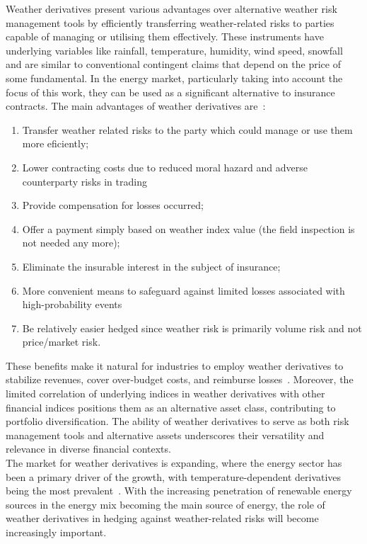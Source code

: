     Weather derivatives present various advantages over alternative weather risk management tools
    by efficiently transferring weather-related risks to parties capable of managing or utilising them effectively.
    These instruments have underlying variables like rainfall, temperature, humidity, wind speed,
    snowfall and are similar to conventional contingent claims that depend on the price of some fundamental.
    In the energy market, particularly taking into account the focus of this work,
    they can be used as a significant alternative to insurance contracts.
    The main advantages of weather derivatives are~\cite{cui_applications_2015}:
    \begin{enumerate}
        \item Transfer weather related risks to the party which could manage or use them more eficiently;
        \item Lower contracting costs due to reduced moral hazard and adverse counterparty risks in trading
        \item Provide compensation for losses occurred;
        \item Offer a payment simply based on weather index value (the field inspection is not needed any more);
        \item Eliminate the insurable interest in the subject of insurance;
        \item More convenient means to safeguard against limited losses associated with high-probability events
        \item Be relatively easier hedged since weather risk is primarily volume risk and not price/market risk.
    \end{enumerate}

    These benefits make it natural for industries to employ weather derivatives to stabilize revenues,
    cover over-budget costs, and reimburse losses~\cite{matsumoto_simultaneous_2021}.
    Moreover, the limited correlation of underlying indices in weather derivatives with other financial indices
    positions them as an alternative asset class, contributing to portfolio diversification.
    The ability of weather derivatives to serve as both risk management tools and alternative assets underscores their
    versatility and relevance in diverse financial contexts.\\

    The market for weather derivatives is expanding, where the energy sector has been a primary driver of the growth,
    with temperature-dependent derivatives being the most prevalent~\cite{ali_pricing_2023}.
    With the increasing penetration of renewable energy sources in the energy mix becoming the main source of energy,
    the role of weather derivatives in hedging against weather-related risks will become increasingly important.

